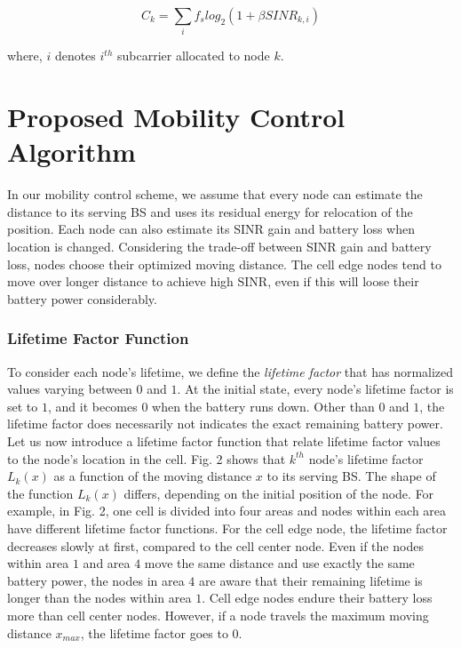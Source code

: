 \documentclass[conference]{IEEEtran}
\begin{document}
\begin{equation}
C_k = \sum_i f_s  log_2 (1 + \beta SINR_{k,i})
\label{eq:eqs6}
\end{equation}

\noindent where, $ i $ denotes $i^{th}$ subcarrier allocated to node $ k $.




\section{Proposed Mobility Control Algorithm }


In our mobility control scheme, we assume that every node can estimate the distance to its serving BS and uses its residual energy for relocation of the position. Each node can also estimate its SINR gain and battery loss when location is changed. Considering the trade-off between SINR gain and battery loss, nodes choose their optimized moving distance. The cell edge nodes tend to move over longer distance to achieve high SINR, even if this will loose their battery power considerably.

\subsubsection{Lifetime Factor Function}
To consider each node's lifetime,
we define the \emph{lifetime factor} that has normalized values varying between  $0$ and $1$. At the initial
state, every node's lifetime factor is set to $1$, and it becomes
$0$ when the battery runs down. Other than $0$ and $1$, the lifetime
factor does necessarily not indicates the exact remaining
battery power. Let us now introduce a lifetime factor function that
relate lifetime factor values to the node's location in the
cell. Fig. 2 shows that $ k^{th} $ node's lifetime
factor $L_{k}(x)$ as a function of the moving distance $x$ to its serving BS. The shape of the function $L_{k}(x)$ differs, depending on the
initial position of the node. For example, in Fig. 2, one cell is divided into
four areas and nodes within each area have different lifetime factor
functions. For the cell edge node, the lifetime factor decreases
slowly at first, compared to the cell center node. Even if the
nodes within area $1$ and area $4$ move the same distance and use
exactly the same battery power, the nodes in area $4$ are aware that
their remaining lifetime is longer than the nodes within area $1$.
Cell edge nodes endure their battery loss more than cell center nodes.
However, if a node travels the maximum
moving distance $ x_{max} $, the lifetime factor goes
to $0$.
\end{document}
